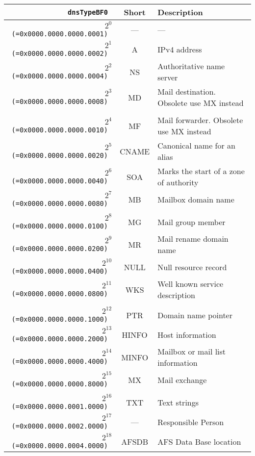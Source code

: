 \documentclass[documentation]{subfiles}
\begin{document}
\begin{longtable}{>{\tt}rcl}
    \toprule
    {\bf dnsTypeBF0}                  & {\bf Short} & {\bf Description}\\
    \midrule\endhead%
    $2^{0}$  (=0x0000.0000.0000.0001) & ---         & --- \\
    $2^{1}$  (=0x0000.0000.0000.0002) & A           & IPv4 address \\
    $2^{2}$  (=0x0000.0000.0000.0004) & NS          & Authoritative name server \\
    $2^{3}$  (=0x0000.0000.0000.0008) & MD          & Mail destination. Obsolete use MX instead \\
    \\
    $2^{4}$  (=0x0000.0000.0000.0010) & MF          & Mail forwarder. Obsolete use MX instead \\
    $2^{5}$  (=0x0000.0000.0000.0020) & CNAME       & Canonical name for an alias \\
    $2^{6}$  (=0x0000.0000.0000.0040) & SOA         & Marks the start of a zone of authority \\
    $2^{7}$  (=0x0000.0000.0000.0080) & MB          & Mailbox domain name \\
    \\
    $2^{8}$  (=0x0000.0000.0000.0100) & MG          & Mail group member \\
    $2^{9}$  (=0x0000.0000.0000.0200) & MR          & Mail rename domain name \\
    $2^{10}$ (=0x0000.0000.0000.0400) & NULL        & Null resource record \\
    $2^{11}$ (=0x0000.0000.0000.0800) & WKS         & Well known service description \\
    \\
    $2^{12}$ (=0x0000.0000.0000.1000) & PTR         & Domain name pointer \\
    $2^{13}$ (=0x0000.0000.0000.2000) & HINFO       & Host information \\
    $2^{14}$ (=0x0000.0000.0000.4000) & MINFO       & Mailbox or mail list information \\
    $2^{15}$ (=0x0000.0000.0000.8000) & MX          & Mail exchange \\
    \\
    $2^{16}$ (=0x0000.0000.0001.0000) & TXT         & Text strings \\
    $2^{17}$ (=0x0000.0000.0002.0000) & ---         & Responsible Person \\
    $2^{18}$ (=0x0000.0000.0004.0000) & AFSDB       & AFS Data Base location \\

\end{longtable}
\end{document}
